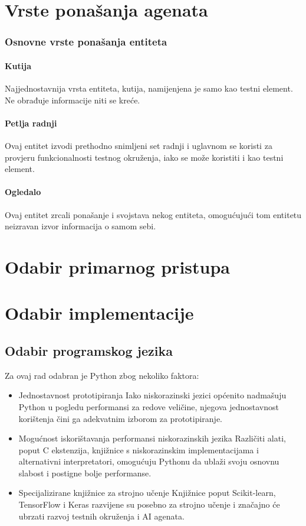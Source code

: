 \documentclass[diplomskirad]{fer}
\begin{document}
\section{Vrste ponašanja agenata}
\subsubsection{Osnovne vrste ponašanja entiteta}
\paragraph{Kutija}
Najjednostavnija vrsta entiteta, kutija, namijenjena je samo kao testni element. Ne obrađuje informacije niti se kreće.
\paragraph{Petlja radnji}
Ovaj entitet izvodi prethodno snimljeni set radnji i uglavnom se koristi za provjeru funkcionalnosti testnog okruženja, iako se može koristiti i kao testni element.
\paragraph{Ogledalo}
Ovaj entitet zrcali ponašanje i svojstava nekog entiteta, omogućujući tom entitetu neizravan izvor informacija o samom sebi.
\section{Odabir primarnog pristupa}
\section{Odabir implementacije}
\subsection{Odabir programskog jezika}
Za ovaj rad odabran je Python zbog nekoliko faktora:
\begin{itemize}
\item Jednostavnost prototipiranja
Iako niskorazinski jezici općenito nadmašuju Python u pogledu performansi za redove veličine, njegova jednostavnost korištenja čini ga adekvatnim izborom za prototipiranje.
\item Mogućnost iskorištavanja performansi niskorazinskih jezika
Različiti alati, poput C ekstenzija, knjižnice s niskorazinskim implementacijama i alternativni interpretatori, omogućuju Pythonu da ublaži svoju osnovnu slabost i postigne bolje performanse.
\item Specijalizirane knjižnice za strojno učenje
Knjižnice poput Scikit-learn, TensorFlow i Keras razvijene su posebno za strojno učenje i značajno će ubrzati razvoj testnih okruženja i AI agenata.
\end{itemize}
\end{document}
